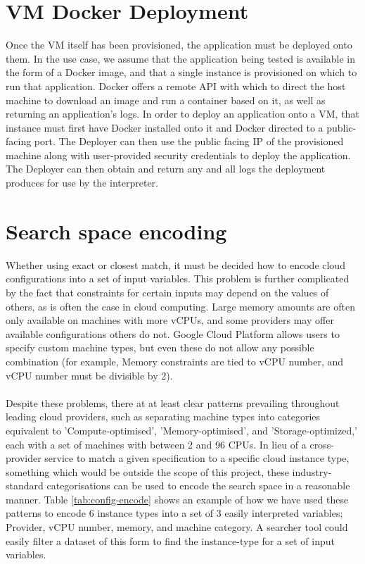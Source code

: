 \documentclass{report}
\begin{document}
\section{VM Docker Deployment}
Once the VM itself has been provisioned, the application must be deployed onto them. In the use case, we assume that the application being tested is available in the form of a Docker image, and that a single instance is provisioned on which to run that application. Docker offers a remote API with which to direct the host machine to download an image and run a container based on it, as well as returning an application's logs. In order to deploy an application onto a VM, that instance must first have Docker installed onto it and Docker directed to a public-facing port. The Deployer can then use the public facing IP of the provisioned machine along with user-provided security credentials to deploy the application. The Deployer can then obtain and return any and all logs the deployment produces for use by the interpreter.

\section{Search space encoding}
Whether using exact or closest match, it must be decided how to encode cloud configurations into a set of input variables. This problem is further complicated by the fact that constraints for certain inputs may depend on the values of others, as is often the case in cloud computing. Large memory amounts are often only available on machines with more vCPUs, and some providers may offer available configurations others do not. Google Cloud Platform allows users to specify custom machine types, but even these do not allow any possible combination (for example, Memory constraints are tied to vCPU number, and vCPU number must be divisible by 2).

\paragraph{}
Despite these problems, there at at least clear patterns prevailing throughout leading cloud providers, such as separating machine types into categories equivalent to 'Compute-optimised', 'Memory-optimised', and 'Storage-optimized,' each with a set of machines with between 2 and 96 CPUs. In lieu of a cross-provider service to match a given specification to a specific cloud instance type, something which would be outside the scope of this project, these industry-standard categorisations can be used to encode the search space in a reasonable manner. Table \ref{tab:config-encode} shows an example of how we have used these patterns to encode 6 instance types into a set of 3 easily interpreted variables; Provider, vCPU number, memory, and machine category. A searcher tool could easily filter a dataset of this form to find the instance-type for a set of input variables.
\end{document}
